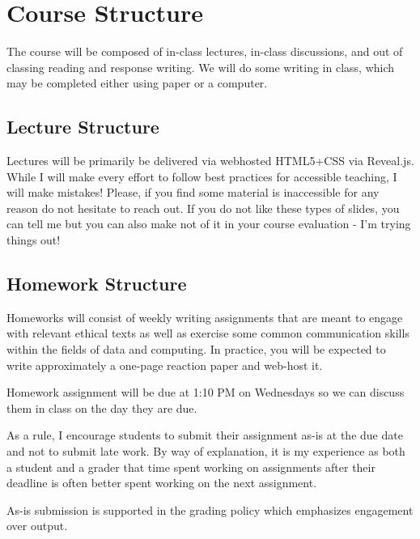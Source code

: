 \documentclass[11pt]{article}
\begin{document}

\section*{Course Structure}

The course will be composed of in-class lectures, in-class discussions, and out of classing reading and response writing. We will do some writing in class, which may be completed either using paper or a computer.

\subsection*{Lecture Structure}


\bigskip
\noindent Lectures will be primarily be delivered via webhosted HTML5+CSS via Reveal.js. While I will make every effort to follow best practices for accessible teaching, I will make mistakes! Please, if you find some material is inaccessible for any reason
do not hesitate to reach out. If you do not like these types of slides, you can tell me but you can also make not of it in your course evaluation - I'm trying things out!


\subsection*{Homework Structure}

\bigskip
\noindent Homeworks will consist of weekly writing assignments that are meant to engage with relevant ethical texts as well as exercise some common communication skills within the fields of data and computing. In practice, you will be expected to write approximately a one-page reaction paper and web-host it.

\bigskip
\noindent Homework assignment will be due at 1:10 PM on Wednesdays so we can discuss them in class on the 
day they are due.

\bigskip
\noindent As a rule, I encourage students to submit their assignment as-is at the due date and not to
submit late work. By way of explanation, it is my experience as both a student and a grader that time spent working on assignments after their deadline is often better spent working on the next assignment.

\bigskip
\noindent As-is submission is supported in the grading policy which emphasizes engagement over output.
\end{document}
